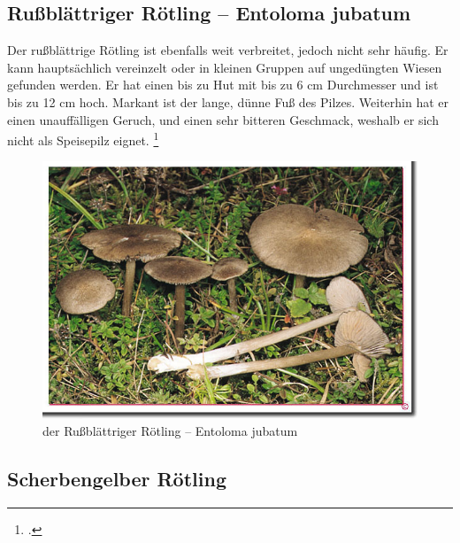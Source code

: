 \documentclass[a4paper,abstracton]{scrreprt}
\begin{document}
\subsection{Rußblättriger Rötling -- Entoloma jubatum}
Der rußblättrige Rötling ist ebenfalls weit verbreitet, jedoch nicht sehr häufig. Er kann hauptsächlich vereinzelt oder in kleinen Gruppen auf ungedüngten Wiesen gefunden werden. Er hat einen bis zu Hut mit bis zu 6 cm Durchmesser und ist bis zu 12 cm hoch. Markant ist der lange, dünne Fuß des Pilzes. Weiterhin hat er einen unauffälligen Geruch, und einen sehr bitteren Geschmack, weshalb er sich nicht als Speisepilz eignet.
\footcite{russblaettrig}
\begin{figure}[H]
\centering
\includegraphics[scale=0.45]{russblaettrig}
\caption{der Rußblättriger Rötling -- Entoloma jubatum }
\label{fig:russblaettrig}
\end{figure}

\subsection{Scherbengelber Rötling}

\printbibliography[heading=lit]
\end{document}
